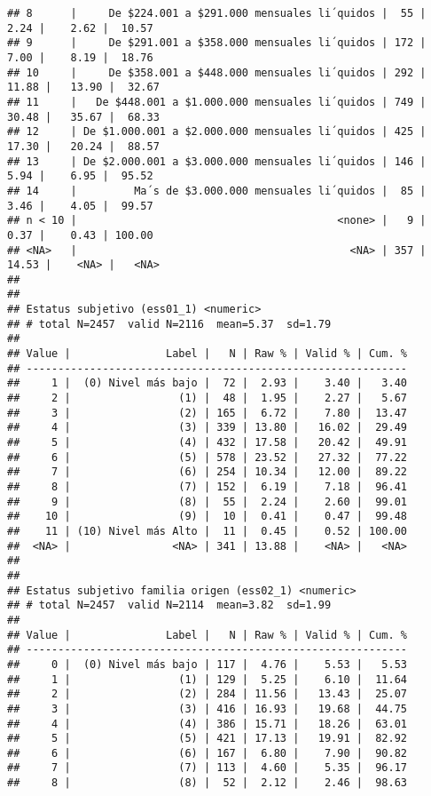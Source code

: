 \documentclass[
  10,
  landscape,
  legalpaper]{article}
\begin{document}
\begin{verbatim}
## 8      |     De $224.001 a $291.000 mensuales li´quidos |  55 |  2.24 |    2.62 |  10.57
## 9      |     De $291.001 a $358.000 mensuales li´quidos | 172 |  7.00 |    8.19 |  18.76
## 10     |     De $358.001 a $448.000 mensuales li´quidos | 292 | 11.88 |   13.90 |  32.67
## 11     |   De $448.001 a $1.000.000 mensuales li´quidos | 749 | 30.48 |   35.67 |  68.33
## 12     | De $1.000.001 a $2.000.000 mensuales li´quidos | 425 | 17.30 |   20.24 |  88.57
## 13     | De $2.000.001 a $3.000.000 mensuales li´quidos | 146 |  5.94 |    6.95 |  95.52
## 14     |         Ma´s de $3.000.000 mensuales li´quidos |  85 |  3.46 |    4.05 |  99.57
## n < 10 |                                         <none> |   9 |  0.37 |    0.43 | 100.00
## <NA>   |                                           <NA> | 357 | 14.53 |    <NA> |   <NA>
## 
## 
## Estatus subjetivo (ess01_1) <numeric>
## # total N=2457  valid N=2116  mean=5.37  sd=1.79
## 
## Value |               Label |   N | Raw % | Valid % | Cum. %
## ------------------------------------------------------------
##     1 |  (0) Nivel más bajo |  72 |  2.93 |    3.40 |   3.40
##     2 |                 (1) |  48 |  1.95 |    2.27 |   5.67
##     3 |                 (2) | 165 |  6.72 |    7.80 |  13.47
##     4 |                 (3) | 339 | 13.80 |   16.02 |  29.49
##     5 |                 (4) | 432 | 17.58 |   20.42 |  49.91
##     6 |                 (5) | 578 | 23.52 |   27.32 |  77.22
##     7 |                 (6) | 254 | 10.34 |   12.00 |  89.22
##     8 |                 (7) | 152 |  6.19 |    7.18 |  96.41
##     9 |                 (8) |  55 |  2.24 |    2.60 |  99.01
##    10 |                 (9) |  10 |  0.41 |    0.47 |  99.48
##    11 | (10) Nivel más Alto |  11 |  0.45 |    0.52 | 100.00
##  <NA> |                <NA> | 341 | 13.88 |    <NA> |   <NA>
## 
## 
## Estatus subjetivo familia origen (ess02_1) <numeric>
## # total N=2457  valid N=2114  mean=3.82  sd=1.99
## 
## Value |               Label |   N | Raw % | Valid % | Cum. %
## ------------------------------------------------------------
##     0 |  (0) Nivel más bajo | 117 |  4.76 |    5.53 |   5.53
##     1 |                 (1) | 129 |  5.25 |    6.10 |  11.64
##     2 |                 (2) | 284 | 11.56 |   13.43 |  25.07
##     3 |                 (3) | 416 | 16.93 |   19.68 |  44.75
##     4 |                 (4) | 386 | 15.71 |   18.26 |  63.01
##     5 |                 (5) | 421 | 17.13 |   19.91 |  82.92
##     6 |                 (6) | 167 |  6.80 |    7.90 |  90.82
##     7 |                 (7) | 113 |  4.60 |    5.35 |  96.17
##     8 |                 (8) |  52 |  2.12 |    2.46 |  98.63

\end{verbatim}
\end{document}
